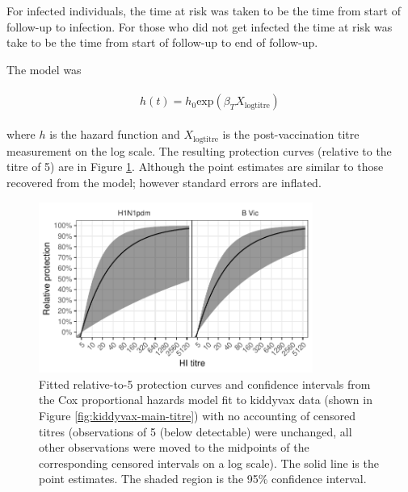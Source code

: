 For infected individuals, the time at risk was taken to be the time from start of follow-up to infection. For those who did not get infected the time at risk was take to be the time from start of follow-up to end of follow-up.

The model was

\begin{align*}
\begin{gathered}
h(t) = h_0\text{exp}(\beta_T X_{\text{logtitre}})
\end{gathered}
\end{align*}

where $h$ is the hazard function and $X_{\text{logtitre}}$ is the post-vaccination titre measurement on the log scale. The resulting protection curves (relative to the titre of 5) are in Figure \ref{fig:kiddyvaxmain-cox}. Although the point estimates are similar to those recovered from the model; however standard errors are inflated.

\begin{figure}[htp]
	\centering
	\includegraphics[width=0.8\textwidth]{../fit-cox-plot/kiddyvaxmain.pdf}
	\caption{
	Fitted relative-to-5 protection curves and confidence intervals from the Cox proportional hazards model fit to kiddyvax data (shown in Figure \ref{fig:kiddyvax-main-titre}) with no accounting of censored titres (observations of 5 (below detectable) were unchanged, all other observations were moved to the midpoints of the corresponding censored intervals on a log scale). The solid line is the point estimates. The shaded region is the 95\% confidence interval.
	}
	\label{fig:kiddyvaxmain-cox}
\end{figure}
